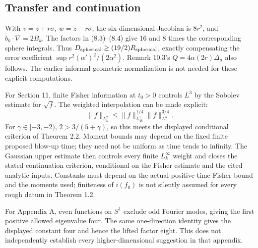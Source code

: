 \documentclass[10pt]{article}
\begin{document}
\subsection*{Transfer and continuation}
With \(v=z+r\sigma,\ w=z-r\sigma\), the six-dimensional Jacobian is \(8r^2\), and \(\widetilde b_k\cdot\nabla=2B_k\). The factors in (8.3)–(8.4) give \(16\) and \(8\) times the corresponding sphere integrals. Thus \(D_{\rm spherical}\geq(19/2)R_{\rm spherical}\), exactly compensating the error coefficient \(\sup r^2(\alpha')^2/(2\alpha^2)\). Remark 10.3’s \(Q=4\alpha(2r)\Delta_\sigma\) also follows. The earlier informal geometric normalization is not needed for these explicit computations.\par
For Section 11, finite Fisher information at \(t_0>0\) controls \(L^3\) by the Sobolev estimate for \(\sqrt f\). The weighted interpolation can be made explicit: \[\|f\|_{L^2_k}
 \leq\|f\|_{L^1_{4k}}^{1/4}\|f\|_{L^3}^{3/4}.\] For \(\gamma\in[-3,-2)\), \(2>3/(5+\gamma)\), so this meets the displayed conditional criterion of Theorem 2.2. Moment bounds may depend on the fixed finite proposed blow-up time; they need not be uniform as time tends to infinity. The Gaussian upper estimate then controls every finite \(L^\infty_k\) weight and closes the stated continuation criterion, conditional on the Fisher estimate and the cited analytic inputs. Constants must depend on the actual positive-time Fisher bound and the moments used; finiteness of \(i(f_0)\) is not silently assumed for every rough datum in Theorem 1.2.\par
For Appendix A, even functions on \(S^1\) exclude odd Fourier modes, giving the first positive allowed eigenvalue four. The same one-direction identity gives the displayed constant four and hence the lifted factor eight. This does not independently establish every higher-dimensional suggestion in that appendix.\par
\end{document}

